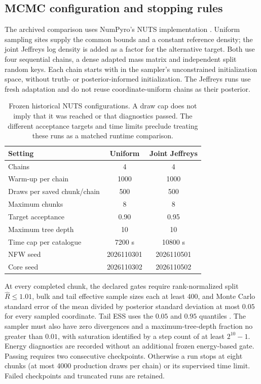 \subsection{MCMC configuration and stopping rules}
\label{sec:sampling}
The archived comparison uses NumPyro's NUTS implementation \citep{hoffman2014,numpyro2019}. Uniform sampling sites supply the common bounds and a constant reference density; the joint Jeffreys log density is added as a factor for the alternative target. Both use four sequential chains, a dense adapted mass matrix and independent split random keys. Each chain starts with  in the sampler's unconstrained initialization space, without truth- or posterior-informed initialization. The Jeffreys runs use fresh adaptation and do not reuse coordinate-uniform chains as their posterior.

\begin{table}
 \centering
 \caption{Frozen historical NUTS configurations. A draw cap does not imply that it was reached or that diagnostics passed. The different acceptance targets and time limits preclude treating these runs as a matched runtime comparison.}
 \label{tab:nuts}
 \small
 \begin{tabular}{lcc}
  \toprule
  Setting & Uniform & Joint Jeffreys\\
  \midrule
  Chains & 4 & 4\\
  Warm-up per chain & 1000 & 1000\\
  Draws per saved chunk/chain & 500 & 500\\
  Maximum chunks & 8 & 8\\
  Target acceptance & 0.90 & 0.95\\
  Maximum tree depth & 10 & 10\\
  Time cap per catalogue & 7200 s & 10800 s\\
  NFW seed & 2026110301 & 2026110501\\
  Core seed & 2026110302 & 2026110502\\
  \bottomrule
 \end{tabular}
\end{table}

At every completed chunk, the declared gates require rank-normalized split $\widehat R\leq1.01$, bulk and tail effective sample sizes each at least 400, and Monte Carlo standard error of the mean divided by posterior standard deviation at most $0.05$ for every sampled coordinate. Tail ESS uses the $0.05$ and $0.95$ quantiles \citep{vehtari2021}. The sampler must also have zero divergences and a maximum-tree-depth fraction no greater than $0.01$, with saturation identified by a step count of at least $2^{10}-1$. Energy diagnostics are recorded without an additional frozen energy-based gate. Passing requires two consecutive checkpoints. Otherwise a run stops at eight chunks (at most 4000 production draws per chain) or its supervised time limit. Failed checkpoints and truncated runs are retained.

